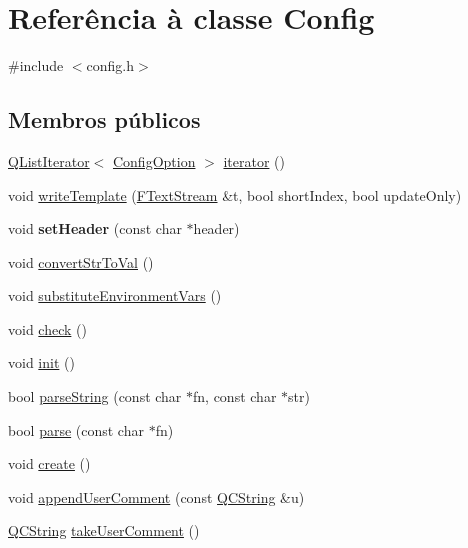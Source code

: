 \hypertarget{class_config}{\section{Referência à classe Config}
\label{class_config}
}


{\ttfamily \#include $<$config.\-h$>$}

\subsection*{Membros públicos}
\begin{DoxyCompactItemize}
\item 
\hyperlink{class_q_list_iterator}{Q\-List\-Iterator}$<$ \hyperlink{class_config_option}{Config\-Option} $>$ \hyperlink{class_config_a2a73a36bdb15195ceea5babf0895841e}{iterator} ()
\item 
void \hyperlink{class_config_a50b1ad2951f80e9cf5021f47bad210a5}{write\-Template} (\hyperlink{class_f_text_stream}{F\-Text\-Stream} \&t, bool short\-Index, bool update\-Only)
\item 
\hypertarget{class_config_a83d1589d35495f9e66971b911650cc7e}{void {\bfseries set\-Header} (const char $\ast$header)}\label{class_config_a83d1589d35495f9e66971b911650cc7e}

\item 
void \hyperlink{class_config_adf2580bb1cb265aed049fd1553c658c2}{convert\-Str\-To\-Val} ()
\item 
void \hyperlink{class_config_a3556bfbc11af507151d5e7b2fcfdf181}{substitute\-Environment\-Vars} ()
\item 
void \hyperlink{class_config_a83f8adca24e250bfb5c9a90a35503ae9}{check} ()
\item 
void \hyperlink{class_config_a02fd73d861ef2e4aabb38c0c9ff82947}{init} ()
\item 
bool \hyperlink{class_config_a106dcaa73bd7f5e08ecc8889d607cf12}{parse\-String} (const char $\ast$fn, const char $\ast$str)
\item 
bool \hyperlink{class_config_a2b817186f44e966ea05461d71babaa57}{parse} (const char $\ast$fn)
\item 
void \hyperlink{class_config_ae2ee59f7cc16ee42559c87e81c433039}{create} ()
\item 
void \hyperlink{class_config_ae02f59400e5a733fbe447cb67c6bd3aa}{append\-User\-Comment} (const \hyperlink{class_q_c_string}{Q\-C\-String} \&u)
\item 
\hyperlink{class_q_c_string}{Q\-C\-String} \hyperlink{class_config_a0e741f180f15929a29642359da844226}{take\-User\-Comment} ()
\end{DoxyCompactItemize}
